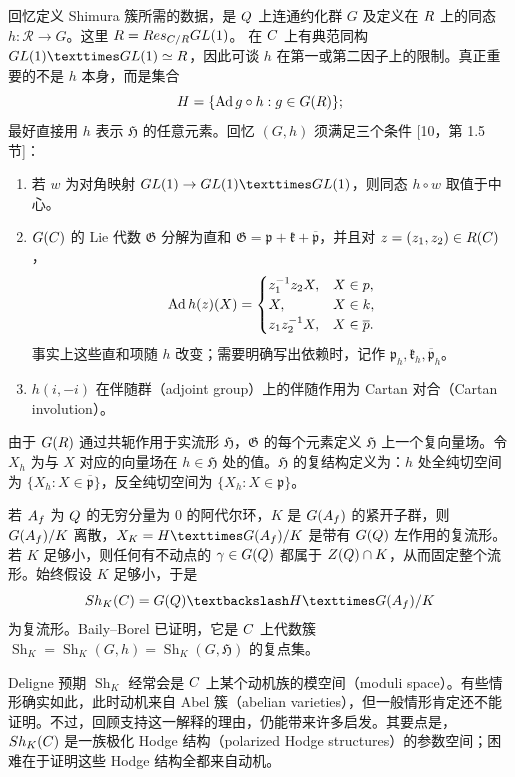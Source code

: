 回忆定义 Shimura 簇所需的数据，是 $Q$ 上连通约化群 $G$ 及定义在 $R$ 上的同态
$h:\mathcal R\to G$。这里 $R=Res_{C/R}GL(1)$。
在 $C$ 上有典范同构 $\GL(1)\times\GL(1)\simeq\mathcal R$，因此可谈
$h$ 在第一或第二因子上的限制。真正重要的不是 $h$ 本身，而是集合
\[
\mathfrak H=\{\Ad g\circ h:g\in G(\R)\};
\]
最好直接用 $h$ 表示 $\mathfrak H$ 的任意元素。回忆 $(G,h)$ 须满足三个条件
[10，第 1.5 节]：
\begin{enumerate}
\item[(a)] 若 $w$ 为对角映射 $\GL(1)\to\GL(1)\times\GL(1)$，则同态
$h\circ w$ 取值于中心。
\item[(b)] $G(C)$ 的 Lie 代数 $\mathfrak G$ 分解为直和
$\mathfrak G=\mathfrak p+\mathfrak k+\overline{\mathfrak p}$，并且对
$z=(z_1,z_2)\in R(C)$，
\[
\Ad h(z)(X)=
\begin{cases}
z_1^{-1}z_2X,&X\in\mathfrak p,\\
X,&X\in\mathfrak k,\\
z_1z_2^{-1}X,&X\in\overline{\mathfrak p}.
\end{cases}
\]
事实上这些直和项随 $h$ 改变；需要明确写出依赖时，记作
$\mathfrak p_h,\mathfrak k_h,\overline{\mathfrak p}_h$。
\item[(c)] $h(i,-i)$ 在伴随群（adjoint group）上的伴随作用为 Cartan 对合（Cartan involution）。
\end{enumerate}
由于 $G(R)$ 通过共轭作用于实流形 $\mathfrak H$，$\mathfrak G$ 的每个元素定义
$\mathfrak H$ 上一个复向量场。令 $X_h$ 为与 $X$ 对应的向量场在
$h\in\mathfrak H$ 处的值。$\mathfrak H$ 的复结构定义为：$h$ 处全纯切空间为
$\{X_h:X\in\overline{\mathfrak p}\}$，反全纯切空间为
$\{X_h:X\in\mathfrak p\}$。

若 $A_f$ 为 $Q$ 的无穷分量为 $0$ 的阿代尔环，$K$ 是 $G(A_f)$ 的紧开子群，则
$G(A_f)/K$ 离散，$X_K=\mathfrak H\times G(\A_f)/K$ 是带有
$G(Q)$ 左作用的复流形。若 $K$ 足够小，则任何有不动点的
$\gamma\in G(Q)$ 都属于 $Z(Q)\cap K$，从而固定整个流形。始终假设
$K$ 足够小，于是
\[
\operatorname{Sh}_K(\C)=G(\Q)\backslash\mathfrak H\times G(\A_f)/K
\]
为复流形。Baily--Borel 已证明，它是 $C$ 上代数簇
$\operatorname{Sh}_K=\operatorname{Sh}_K(G,h)=\operatorname{Sh}_K(G,\mathfrak H)$ 的复点集。

Deligne 预期 $\operatorname{Sh}_K$ 经常会是 $C$ 上某个动机族的模空间（moduli space）。有些情形确实如此，此时动机来自 Abel 簇（abelian varieties），但一般情形肯定还不能证明。不过，回顾支持这一解释的理由，仍能带来许多启发。其要点是，
$Sh_K(C)$ 是一族极化 Hodge 结构（polarized Hodge structures）的参数空间；困难在于证明这些 Hodge 结构全都来自动机。

